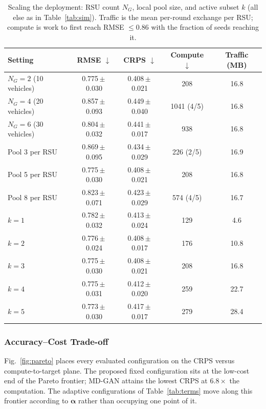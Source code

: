 \documentclass[journal]{IEEEtran}
\newcommand{\valpha}{\boldsymbol{\alpha}}
\begin{document}
\begin{table}[!t]
\centering
\caption{Scaling the deployment: RSU count $N_G$, local pool size, and active
subset $k$ (all else as in Table~\ref{tab:sim}). Traffic is the mean per-round
exchange per RSU; compute is work to first reach RMSE $\le0.86$ with the
fraction of seeds reaching it.}
\label{tab:scale}
\footnotesize
\begin{tabular}{lcccc}
\toprule
Setting & RMSE $\downarrow$ & CRPS $\downarrow$ & Compute $\downarrow$ & Traffic (MB) \\
\midrule
$N_G=2$ (10 vehicles) & 0.775\,$\pm$\,0.030 & 0.408\,$\pm$\,0.021 & 208 & 16.8 \\
$N_G=4$ (20 vehicles) & 0.857\,$\pm$\,0.093 & 0.449\,$\pm$\,0.040 & 1041 (4/5) & 16.8 \\
$N_G=6$ (30 vehicles) & 0.804\,$\pm$\,0.032 & 0.441\,$\pm$\,0.017 & 938 & 16.8 \\
\midrule
Pool 3 per RSU & 0.869\,$\pm$\,0.095 & 0.434\,$\pm$\,0.029 & 226 (2/5) & 16.9 \\
Pool 5 per RSU & 0.775\,$\pm$\,0.030 & 0.408\,$\pm$\,0.021 & 208 & 16.8 \\
Pool 8 per RSU & 0.823\,$\pm$\,0.071 & 0.423\,$\pm$\,0.029 & 574 (4/5) & 16.7 \\
\midrule
$k=1$ & 0.782\,$\pm$\,0.032 & 0.413\,$\pm$\,0.024 & 129 & 4.6 \\
$k=2$ & 0.776\,$\pm$\,0.024 & 0.408\,$\pm$\,0.017 & 176 & 10.8 \\
$k=3$ & 0.775\,$\pm$\,0.030 & 0.408\,$\pm$\,0.021 & 208 & 16.8 \\
$k=4$ & 0.775\,$\pm$\,0.031 & 0.412\,$\pm$\,0.020 & 259 & 22.7 \\
$k=5$ & 0.773\,$\pm$\,0.030 & 0.417\,$\pm$\,0.017 & 279 & 28.4 \\
\bottomrule
\end{tabular}
\end{table}

\subsubsection{Accuracy--Cost Trade-off}
Fig.~\ref{fig:pareto} places every evaluated configuration on the CRPS versus
compute-to-target plane. The proposed fixed configuration sits at the low-cost
end of the Pareto frontier; MD-GAN attains the lowest CRPS at $6.8\times$ the
computation. The adaptive configurations of Table~\ref{tab:terms} move along
this frontier according to $\valpha$ rather than occupying one point of it.
\end{document}
